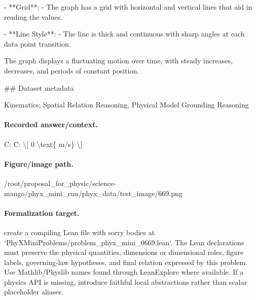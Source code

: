 - **Grid**:
  - The graph has a grid with horizontal and vertical lines that aid in reading the values.

- **Line Style**:
  - The line is thick and continuous with sharp angles at each data point transition.

The graph displays a fluctuating motion over time, with steady increases, decreases, and periods of constant position.

\#\# Dataset metadata

Kinematics; Spatial Relation Reasoning, Physical Model Grounding Reasoning

\paragraph{Recorded answer/context.}
C: C: \textbackslash{}[ 0 \textbackslash{}text\{ m/s\} \textbackslash{}]

\paragraph{Figure/image path.}
/root/proposal\_for\_physic/science-mango/phyx\_mini\_run/phyx\_data/test\_image/669.png

\paragraph{Formalization target.}
create a compiling Lean file with sorry bodies at `PhyXMiniProblems/problem\_phyx\_mini\_0669.lean`. The Lean declarations must preserve the physical quantities, dimensions or dimensional roles, figure labels, governing-law hypotheses, and final relation expressed by this problem.
Use Mathlib/Physlib names found through LeanExplore where available. If a physics API is missing, introduce faithful local abstractions rather than scalar placeholder aliases.

